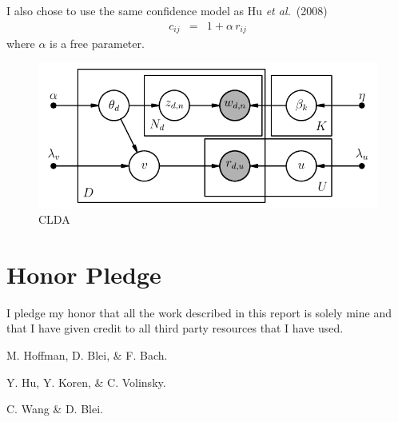 \documentclass[11pt]{article}
\newcommand{\figlabel}[1]{\label{fig:#1}}
\newcommand{\etal}{\emph{et al.}}
\begin{document}
I also chose to use the same confidence model as Hu \etal~(2008)
\begin{eqnarray}
c_{ij} &=& 1+\alpha\,r_{ij}
\end{eqnarray}
where $\alpha$ is a free parameter.

\newpage
\begin{multicols}{2}
\begin{figure}
\centering
\includegraphics{clda.pdf}
\caption{%
CLDA
\figlabel{clda}}
\end{figure}
\end{multicols}

\newpage
\section{Honor Pledge}
I pledge my honor that all the work described in this report is solely mine
and that I have given credit to all third party resources that I have used.

\begin{thebibliography}{}

M. Hoffman, D. Blei, \& F. Bach.

Y. Hu, Y. Koren, \& C. Volinsky.

C. Wang \& D. Blei.

\end{thebibliography}
\end{document}
